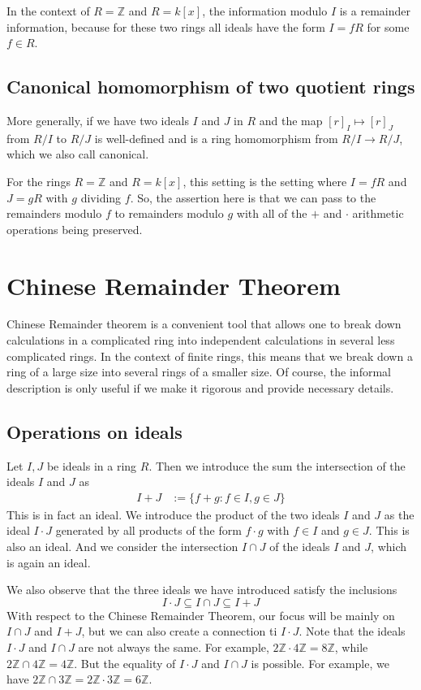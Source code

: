 \documentclass[11pt,a4paper]{amsart}
\newcommand{\Z}{{\mathbb{Z}}}
\begin{document}
In the context of $R = \Z$ and $R = k[x]$, the information modulo $I$ is a remainder information, because for these two rings all ideals have the form $I = f R$ for some $f \in R$. 

\subsection{Canonical homomorphism of two quotient rings} More generally, if we have two ideals $I$ and $J$ in $R$ and the map $[r]_I \mapsto [r]_J$ from $R/ I$ to $R / J$ is well-defined and is a ring homomorphism from $R/ I \to R / J$, which we also call canonical. 

For the rings $R = \Z$ and $R = k[x]$, this setting is the setting where $I = f R$ and $J = g R$ with $g$ dividing $f$. So, the assertion here is that we can pass to the remainders modulo $f$ to remainders modulo $g$ with all of the $+$ and $\cdot$ arithmetic operations being preserved. 

\section{Chinese Remainder Theorem} 

Chinese Remainder theorem is a convenient tool that allows one to break down calculations in a complicated ring into independent calculations in several less complicated rings. In the context of finite rings, this means that we break down a ring of a large size into several rings of a smaller size. Of course, the informal description is only useful if we make it rigorous and provide necessary details. 

\subsection{Operations on ideals} Let $I, J$ be ideals in a ring $R$. Then we introduce the sum the intersection of the ideals $I$ and $J$ as 
\begin{align*} 
	I + J & := \{ f+ g \colon f \in I, g \in J\}
\end{align*} 
This is in fact an ideal. We introduce the product of the two ideals $I$ and $J$ as the ideal $I \cdot J$ generated by all products of the form $f \cdot g$ with $f \in I$ and $g \in J$. This is also an ideal. And we consider the intersection $I \cap J$ of the ideals $I$ and $J$, which is again an ideal. 

We also observe that the three ideals we have introduced satisfy the inclusions 
\[
	I \cdot J \subseteq I \cap J \subseteq I + J
\] 
With respect to the Chinese Remainder Theorem, our focus will be mainly on $I \cap J$ and $I + J$, but we can also create a connection ti $I \cdot J$. Note that the ideals $I \cdot J$ and $I \cap J$ are not always the same. For example, $2 \Z \cdot 4 \Z = 8 \Z$, while $2 \Z \cap 4 \Z = 4 \Z$. But the equality of $I \cdot J$ and $I \cap J$ is possible. For example, we have $2 \Z \cap 3 \Z = 2 \Z \cdot 3 \Z = 6 \Z$. 
\end{document}
